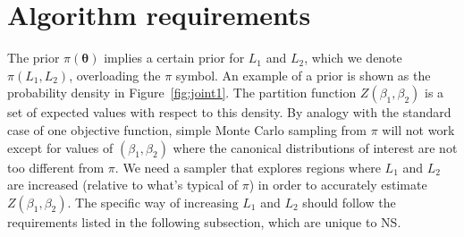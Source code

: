 \documentclass[entropy,article,submit,moreauthors,pdftex,10pt,a4paper]{Definitions/mdpi}
\newcommand{\xx}{\boldsymbol{\theta}}
\begin{document}
\section{Algorithm requirements}
The prior $\pi(\xx)$ implies a certain prior for $L_1$ and $L_2$, which we
denote $\pi(L_1, L_2)$, overloading the $\pi$ symbol.
An example of a prior is shown as the
probability density in Figure~\ref{fig:joint1}. The partition function
$Z(\beta_1, \beta_2)$ is a set of expected values with respect to this density.
By analogy with the standard case of one objective function,
simple Monte Carlo sampling from $\pi$ will not work except for values of
$(\beta_1, \beta_2)$ where the canonical distributions of interest are
not too different from $\pi$.
We need a sampler that explores regions where $L_1$ and $L_2$ are increased
(relative to what's typical of $\pi$) in order
to accurately estimate $Z(\beta_1, \beta_2)$. The specific way of increasing
$L_1$ and $L_2$ should follow the requirements listed in the following
subsection, which are unique to NS.



\end{document}
